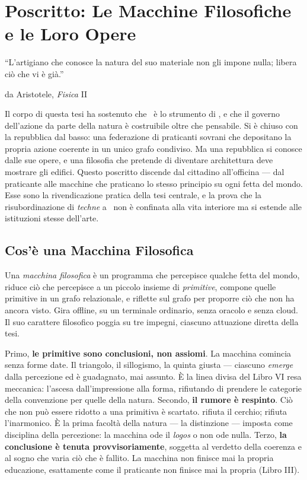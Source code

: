 \chapter*{Poscritto: Le Macchine Filosofiche e le Loro Opere}

\epigraph{``L'artigiano che conosce la natura del suo materiale non gli impone
nulla; libera ci\`o che vi \`e gi\`a.''}{da Aristotele, \emph{Fisica} II}

Il corpo di questa tesi ha sostenuto che \praxis\ \`e lo strumento di \physis, e
che il governo dell'azione da parte della natura \`e costruibile oltre che
pensabile. Si \`e chiuso con la repubblica dal basso: una federazione di
praticanti sovrani che depositano la propria azione coerente in un unico grafo
condiviso. Ma una repubblica si conosce dalle sue opere, e una filosofia che
pretende di diventare architettura deve mostrare gli edifici. Questo poscritto
discende dal cittadino all'officina --- dal praticante alle macchine che
praticano lo stesso principio su ogni fetta del mondo. Esse sono la rivendicazione
pratica della tesi centrale, e la prova che la risubordinazione di \emph{techne}
a \physis\ non \`e confinata alla vita interiore ma si estende alle istituzioni
stesse dell'arte.

\section*{Cos'\`e una Macchina Filosofica}

Una \emph{macchina filosofica} \`e un programma che percepisce qualche fetta del
mondo, riduce ci\`o che percepisce a un piccolo insieme di \emph{primitive},
compone quelle primitive in un grafo relazionale, e riflette sul grafo per
proporre ci\`o che non ha ancora visto. Gira offline, su un terminale ordinario,
senza oracolo e senza cloud. Il suo carattere filosofico poggia su tre impegni,
ciascuno attuazione diretta della tesi.

Primo, \textbf{le primitive sono conclusioni, non assiomi}. La macchina comincia
senza forme date. Il triangolo, il sillogismo, la quinta giusta --- ciascuno
\emph{emerge} dalla percezione ed \`e guadagnato, mai assunto. \`E la linea
divisa del Libro VI resa meccanica: l'ascesa dall'impressione alla forma,
rifiutando di prendere le categorie della convenzione per quelle della natura.
Secondo, \textbf{il rumore \`e respinto}. Ci\`o che non pu\`o essere ridotto a una
primitiva \`e scartato.  rifiuta il cerchio; 
rifiuta l'inarmonico. \`E la prima facolt\`a della natura --- la distinzione ---
imposta come disciplina della percezione: la macchina ode il \emph{logos} o non
ode nulla. Terzo, \textbf{la conclusione \`e tenuta provvisoriamente}, soggetta al
verdetto della coerenza e al sogno che varia ci\`o che \`e fallito. La macchina
non finisce mai la propria educazione, esattamente come il praticante non finisce
mai la propria (Libro III).

